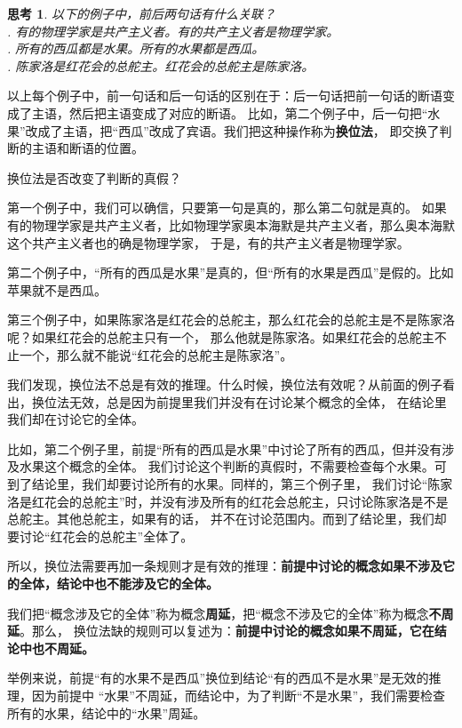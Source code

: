 \documentclass[12pt,UTF8]{ctexbook}
\newtheorem{sk}{思考}[section]
\begin{document}
\begin{sk}\label{sk:2-1-1} 
    以下的例子中，前后两句话有什么关联？\\
    . 有的物理学家是共产主义者。有的共产主义者是物理学家。\\
    . 所有的西瓜都是水果。所有的水果都是西瓜。\\
    . 陈家洛是红花会的总舵主。红花会的总舵主是陈家洛。
\end{sk}
以上每个例子中，前一句话和后一句话的区别在于：后一句话把前一句话的断语变成了主语，然后把主语变成了对应的断语。
比如，第二个例子中，后一句把“水果”改成了主语，把“西瓜”改成了宾语。我们把这种操作称为\textbf{换位法}，
即交换了判断的主语和断语的位置。

换位法是否改变了判断的真假？

第一个例子中，我们可以确信，只要第一句是真的，那么第二句就是真的。
如果有的物理学家是共产主义者，比如物理学家奥本海默是共产主义者，那么奥本海默这个共产主义者也的确是物理学家，
于是，有的共产主义者是物理学家。

第二个例子中，“所有的西瓜是水果”是真的，但“所有的水果是西瓜”是假的。比如苹果就不是西瓜。

第三个例子中，如果陈家洛是红花会的总舵主，那么红花会的总舵主是不是陈家洛呢？如果红花会的总舵主只有一个，
那么他就是陈家洛。如果红花会的总舵主不止一个，那么就不能说“红花会的总舵主是陈家洛”。

我们发现，换位法不总是有效的推理。什么时候，换位法有效呢？从前面的例子看出，换位法无效，总是因为前提里我们并没有在讨论某个概念的全体，
在结论里我们却在讨论它的全体。

比如，第二个例子里，前提“所有的西瓜是水果”中讨论了所有的西瓜，但并没有涉及水果这个概念的全体。
我们讨论这个判断的真假时，不需要检查每个水果。可到了结论里，我们却要讨论所有的水果。同样的，第三个例子里，
我们讨论“陈家洛是红花会的总舵主”时，并没有涉及所有的红花会总舵主，只讨论陈家洛是不是总舵主。其他总舵主，如果有的话，
并不在讨论范围内。而到了结论里，我们却要讨论“红花会的总舵主”全体了。

所以，换位法需要再加一条规则才是有效的推理：\textbf{前提中讨论的概念如果不涉及它的全体，结论中也不能涉及它的全体。}

我们把“概念涉及它的全体”称为概念\textbf{周延}，把“概念不涉及它的全体”称为概念\textbf{不周延}。那么，
换位法缺的规则可以复述为：\textbf{前提中讨论的概念如果不周延，它在结论中也不周延。}

举例来说，前提“有的水果不是西瓜”换位到结论“有的西瓜不是水果”是无效的推理，因为前提中
“水果”不周延，而结论中，为了判断“不是水果”，我们需要检查所有的水果，结论中的“水果”周延。
\end{document}
